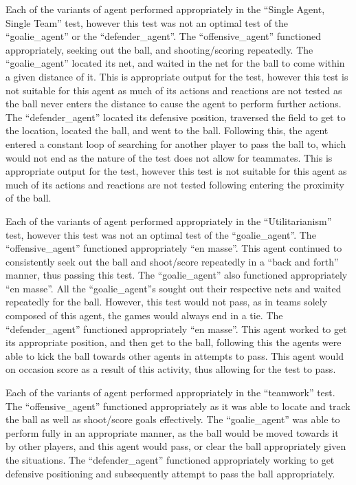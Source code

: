 \documentclass[conference]{IEEEtran}
\begin{document}
Each of the variants of agent performed appropriately in the ``Single Agent, Single Team'' test, however this test was not an optimal test of the ``goalie\_agent'' or the ``defender\_agent''.
The ``offensive\_agent'' functioned appropriately, seeking out the ball, and shooting/scoring repeatedly.
The ``goalie\_agent'' located its net, and waited in the net for the ball to come within a given distance of it.
This is appropriate output for the test, however this test is not suitable for this agent as much of its actions and reactions are not tested as the ball never enters the distance to cause the agent to perform further actions.
The ``defender\_agent'' located its defensive position, traversed the field to get to the location, located the ball, and went to the ball.
Following this, the agent entered a constant loop of searching for another player to pass the ball to, which would not end as the nature of the test does not allow for teammates.
This is appropriate output for the test, however this test is not suitable for this agent as much of its actions and reactions are not tested following entering the proximity of the ball.

Each of the variants of agent performed appropriately in the ``Utilitarianism'' test, however this test was not an optimal test of the ``goalie\_agent''.
The ``offensive\_agent'' functioned appropriately ``en masse''.
This agent continued to consistently seek out the ball and shoot/score repeatedly in a ``back and forth'' manner, thus passing this test.
The ``goalie\_agent'' also functioned appropriately ``en masse''.
All the ``goalie\_agent''s sought out their respective nets and waited repeatedly for the ball.
However, this test would not pass, as in teams solely composed of this agent, the games would always end in a tie.
The ``defender\_agent'' functioned appropriately ``en masse''.
This agent worked to get its appropriate position, and then get to the ball, following this the agents were able to kick the ball towards other agents in attempts to pass.
This agent would on occasion score as a result of this activity, thus allowing for the test to pass.

Each of the variants of agent performed appropriately in the ``teamwork'' test.
The ``offensive\_agent'' functioned appropriately as it was able to locate and track the ball as well as shoot/score goals effectively.
The ``goalie\_agent'' was able to perform fully in an appropriate manner, as the ball would be moved towards it by other players, and this agent would pass, or clear the ball appropriately given the situations.
The ``defender\_agent'' functioned appropriately working to get defensive positioning and subsequently attempt to pass the ball appropriately.
\end{document}
